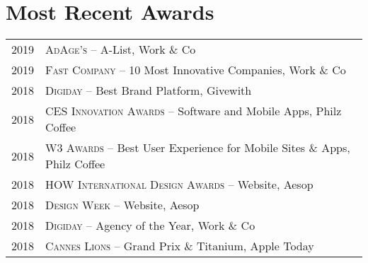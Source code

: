 \documentclass[a4paper,10pt]{article}
\begin{document}
\section{Most Recent Awards}
\begin{tabular}{rl}
  \textsc{2019} & \textsc{AdAge's} -- A-List, Work \& Co \\
  \textsc{2019} & \textsc{Fast Company} -- 10 Most Innovative Companies, Work \& Co \\
  \textsc{2018} & \textsc{Digiday} -- Best Brand Platform, Givewith \\
  \textsc{2018} & \textsc{CES Innovation Awards} -- Software and Mobile Apps, Philz Coffee \\
  \textsc{2018} & \textsc{W3 Awards} -- Best User Experience for Mobile Sites \& Apps, Philz Coffee \\
  \textsc{2018} & \textsc{HOW International Design Awards} -- Website, Aesop \\
  \textsc{2018} & \textsc{Design Week} -- Website, Aesop \\
  \textsc{2018} & \textsc{Digiday} -- Agency of the Year, Work \& Co \\
  \textsc{2018} & \textsc{Cannes Lions} -- Grand Prix \& Titanium, Apple Today\\
\end{tabular}


\end{document}

